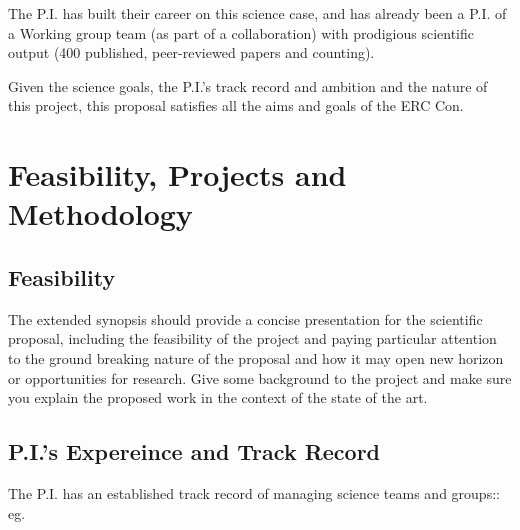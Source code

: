 \documentclass[oneside, a4paper, onecolumn, 11pt]{article}
\begin{document}
\smallskip
\smallskip
\noindent
The P.I. has built their career on this science case, and has already been a P.I. 
of a Working group team (as part of a collaboration) with prodigious scientific
output (400 published, peer-reviewed papers and counting). 

Given the science goals, the P.I.'s track record and ambition and 
the nature of this project, this proposal satisfies all the aims and goals
of the ERC Con. 


\smallskip
\smallskip
\noindent
\section{\textcolor{Cerulean}{Feasibility, Projects and Methodology}}

\subsection*{Feasibility}
The extended synopsis should provide a concise presentation for the
scientific proposal, including the feasibility of the project and
paying particular attention to the ground breaking nature of the
proposal and how it may open new horizon or opportunities for
research. Give some background to the project and make sure you
explain the proposed work in the context of the state of the art.

\subsection*{P.I.'s Expereince and Track Record}
The P.I. has an established track record of managing science teams and groups:: 
eg. 
\end{document}
